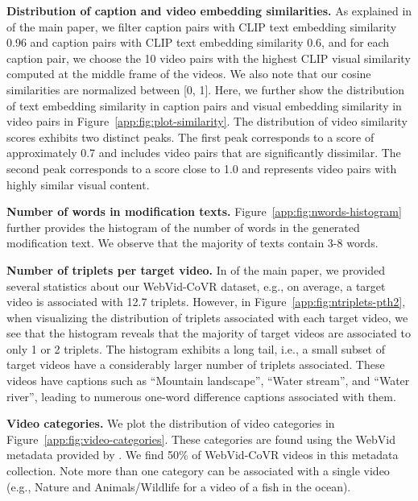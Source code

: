 \noindent\textbf{Distribution of caption and video embedding similarities.}
As explained in 
\if{} \fi
of the main paper,
we filter caption pairs with CLIP text embedding similarity  0.96 
and caption pairs with CLIP text embedding similarity  0.6, and for each caption pair, we choose the 10 video pairs with the highest CLIP visual similarity computed at the middle frame of the videos.
We also note that our cosine similarities are normalized between [0, 1].
Here, we further show the distribution of text embedding similarity in caption pairs and visual embedding similarity in video pairs in Figure~\ref{app:fig:plot-similarity}.
The distribution of video similarity scores exhibits two distinct peaks. 
The first peak corresponds to a score of approximately 0.7 and includes video pairs that are significantly dissimilar.
The second peak corresponds to a score close to 1.0 and represents video pairs 
with highly similar visual content.

\noindent\textbf{Number of words in modification texts.}
Figure~\ref{app:fig:nwords-histogram} further provides the histogram of the
number of words in the generated modification text. We observe that the majority
of texts contain 3-8 words.

\noindent\textbf{Number of triplets per target video.}
In
\if{} \fi
of the main paper,
we provided several statistics about our WebVid-CoVR dataset, e.g., 
on average, a target video is associated with 12.7 triplets.
However, in Figure~\ref{app:fig:ntriplets-pth2}, when visualizing 
the distribution of triplets associated with each target video, we see that
the histogram reveals that the majority of target videos are associated to only 1 or 2 triplets. 
The histogram exhibits a long tail, i.e., a small subset of target videos have a considerably larger number of triplets associated. 
These videos have captions such as ``Mountain landscape'', ``Water stream'', and ``Water river'', leading to numerous one-word difference captions associated with them.
  
\noindent\textbf{Video categories.}
We plot the distribution of video categories in Figure~\ref{app:fig:video-categories}. These categories are found using the WebVid metadata provided by \cite{cleanvid}.
We find 50\% of WebVid-CoVR videos in this metadata collection. Note more than one category can be associated with a single video (e.g., Nature and Animals/Wildlife for a video of a fish in the ocean).


